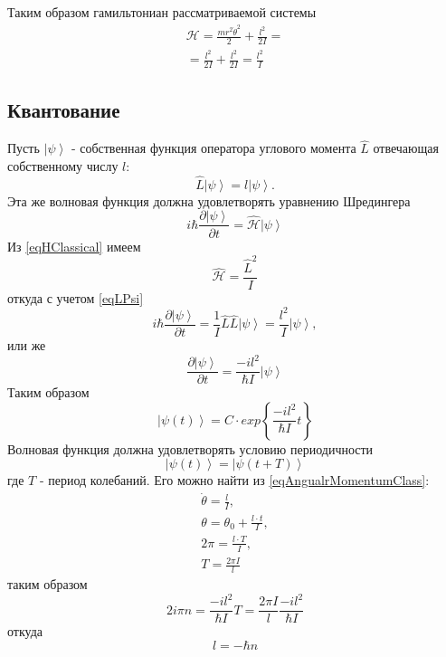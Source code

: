 Таким образом гамильтониан рассматриваемой системы
\begin{eqnarray}
\mathcal{H} = \frac{m r^2 \dot{\theta}^2 }{2} + \frac{l^2}{2 I} = 
\nonumber \\
= \frac{l^2}{2 I} + \frac{l^2}{2 I} = \frac{l^2}{I}
\label{eqHClassical}
\end{eqnarray}

\subsection{Квантование}

Пусть $\left|\psi\right>$ - собственная функция оператора углового
момента $\hat{L}$ отвечающая собственному числу $l$:
\begin{equation}
\hat{L} \left|\psi\right> = l \left|\psi\right>.
\label{eqLPsi}
\end{equation}
Эта же волновая функция должна удовлетворять уравнению Шредингера
\[
i \hbar \frac{\partial \left|\psi\right>}{ \partial t} = 
\hat { \mathcal{H} } \left|\psi\right>
\]
Из \eqref{eqHClassical} имеем
\[
\hat { \mathcal{H} } = \frac{\hat{L}^2}{I}
\]
откуда с учетом \eqref{eqLPsi}
\[
i \hbar \frac{\partial \left|\psi\right>}{ \partial t} = 
\frac{1}{I} \hat{L} \hat{L} \left|\psi\right> = 
\frac{l^2}{I} \left|\psi\right>,
\]
или же
\[
\frac{\partial \left|\psi\right>}{ \partial t} = 
\frac{-i l^2}{\hbar I} \left|\psi\right>
\]
Таким образом
\[
\left|\psi\left(t \right)\right> = C \cdot exp\left\{\frac{-i l^2}{\hbar
    I} t
\right\}
\]
Волновая функция должна удовлетворять условию периодичности
\[
\left|\psi\left(t \right) \right>= \left|\psi\left(t + T \right)\right>
\]
где $T$ - период колебаний. Его можно найти из
\eqref{eqAngualrMomentumClass}:
\begin{eqnarray}
\dot{\theta} = \frac{l}{I},
\nonumber \\
\theta = \theta_0 + \frac{l \cdot t}{I},
\nonumber \\
2 \pi = \frac{l \cdot T}{I},
\nonumber \\
T = \frac{2 \pi I}{l}
\nonumber 
\end{eqnarray}
таким образом
\[
2 i \pi n = \frac{-i l^2}{\hbar I} T = 
\frac{2 \pi I}{l} \frac{-i l^2}{\hbar I}
\]
откуда
\[
l = -\hbar n
\]
